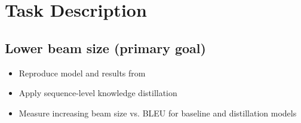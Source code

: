 \documentclass[english]{uzhpub}
\begin{document}




\newpage

\section{Task Description}

\subsection{Lower beam size (primary goal)}

\begin{itemize}
	\item Reproduce model and results from \cite{youmaynotneedattention}
	\item Apply sequence-level knowledge distillation
	\item Measure increasing beam size vs. BLEU for baseline and distillation models
\end{itemize}
\end{document}
